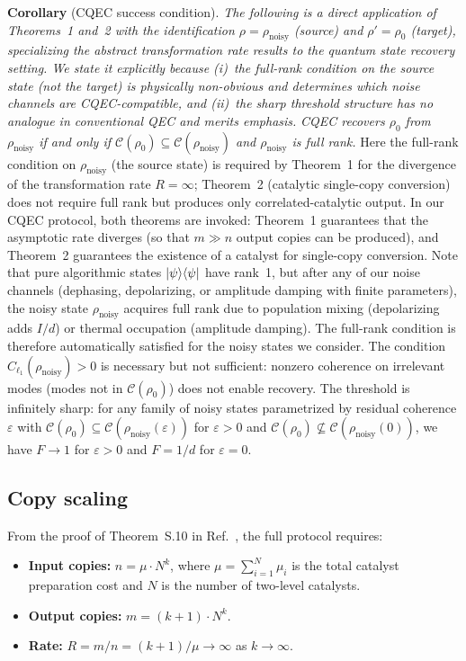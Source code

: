 \documentclass[prx,twocolumn,superscriptaddress,longbibliography,floatfix]{revtex4-2}
\begin{document}
\textbf{Corollary} (CQEC success condition).
\emph{The following is a direct application of Theorems~1 and~2 with the identification $\rho = \rho_\mathrm{noisy}$ (source) and $\rho' = \rho_0$ (target), specializing the abstract transformation rate results to the quantum state recovery setting.
We state it explicitly because (i)~the full-rank condition on the \emph{source} state (not the target) is physically non-obvious and determines which noise channels are CQEC-compatible, and (ii)~the sharp threshold structure has no analogue in conventional QEC and merits emphasis.}
\emph{CQEC recovers $\rho_0$ from $\rho_\mathrm{noisy}$ if and only if $\mathcal{C}(\rho_0) \subseteq \mathcal{C}(\rho_\mathrm{noisy})$ and $\rho_\mathrm{noisy}$ is full rank.}
Here the full-rank condition on $\rho_\mathrm{noisy}$ (the source state) is required by Theorem~1 for the divergence of the transformation rate $R = \infty$; Theorem~2 (catalytic single-copy conversion) does not require full rank but produces only correlated-catalytic output.
In our CQEC protocol, both theorems are invoked: Theorem~1 guarantees that the asymptotic rate diverges (so that $m \gg n$ output copies can be produced), and Theorem~2 guarantees the existence of a catalyst for single-copy conversion.
Note that pure algorithmic states $\ket{\psi}\!\bra{\psi}$ have rank~1, but after any of our noise channels (dephasing, depolarizing, or amplitude damping with finite parameters), the noisy state $\rho_\mathrm{noisy}$ acquires full rank due to population mixing (depolarizing adds $I/d$) or thermal occupation (amplitude damping).
The full-rank condition is therefore automatically satisfied for the noisy states we consider.
The condition $C_{\ell_1}(\rho_\mathrm{noisy}) > 0$ is necessary but not sufficient: nonzero coherence on irrelevant modes (modes not in $\mathcal{C}(\rho_0)$) does not enable recovery.
The threshold is infinitely sharp: for any family of noisy states parametrized by residual coherence $\varepsilon$ with $\mathcal{C}(\rho_0) \subseteq \mathcal{C}(\rho_\mathrm{noisy}(\varepsilon))$ for $\varepsilon > 0$ and $\mathcal{C}(\rho_0) \not\subseteq \mathcal{C}(\rho_\mathrm{noisy}(0))$, we have $F \to 1$ for $\varepsilon > 0$ and $F = 1/d$ for $\varepsilon = 0$.


\subsection{Copy scaling}
\label{sec:copy_scaling}

From the proof of Theorem~S.10 in Ref.~\cite{Shiraishi2024}, the full protocol requires:
\begin{itemize}
\item \textbf{Input copies:} $n = \mu \cdot N^k$, where $\mu = \sum_{i=1}^{N} \mu_i$ is the total catalyst preparation cost and $N$ is the number of two-level catalysts.
\item \textbf{Output copies:} $m = (k+1) \cdot N^k$.
\item \textbf{Rate:} $R = m/n = (k+1)/\mu \to \infty$ as $k \to \infty$.
\end{itemize}
\end{document}

